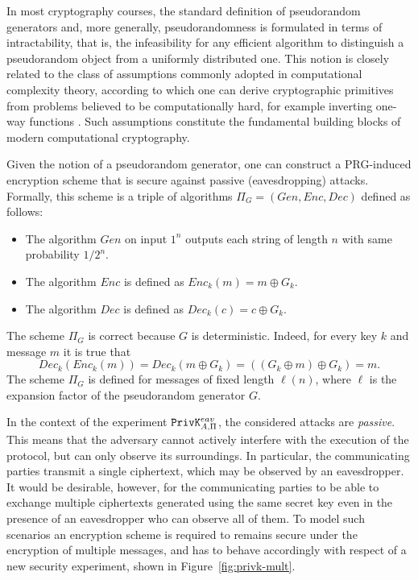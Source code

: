 In most cryptography courses, the standard definition of pseudorandom generators and, more generally, pseudorandomness is formulated in terms of intractability, that is, the infeasibility for any efficient algorithm to distinguish a pseudorandom object from a uniformly distributed one. This notion is closely related to the class of assumptions commonly adopted in computational complexity theory, according to which one can derive cryptographic primitives from problems believed to be computationally hard, for example inverting one-way functions \cite{compuational-complexity}. Such assumptions constitute the fundamental building blocks of modern computational cryptography.

Given the notion of a pseudorandom generator, one can construct a PRG-induced encryption scheme that is secure against passive (eavesdropping) attacks. Formally, this scheme is a triple of algorithms $\Pi_G = (Gen, Enc, Dec)$ defined as follows:
\begin{itemize}
    \item The algorithm $Gen$ on input $1^n$ outputs each string of length $n$ with same probability $1/2^n$.
    \item The algorithm $Enc$ is defined as $Enc_k(m) = m \oplus G_k$.
    \item The algorithm $Dec$ is defined as $Dec_k(c) = c \oplus G_k$.
\end{itemize}

The scheme $\Pi_G$ is correct because $G$ is deterministic. Indeed, for every key $k$ and message $m$ it is true that 
\[ Dec_k(Enc_k(m)) = Dec_k(m \oplus G_k) = ((G_k \oplus m) \oplus G_k)  = m. \]
The scheme $\Pi_G$ is defined for messages of fixed length $\ell(n)$, where $\ell$ is the expansion factor of the pseudorandom generator $G$.

In the context of the experiment $\mathtt{PrivK}^{eav}_{A,\Pi}$, the considered attacks are \emph{passive}. This means that the adversary cannot actively interfere with the execution of the protocol, but can only observe its surroundings. In particular, the communicating parties transmit a single ciphertext, which may be observed by an eavesdropper. It would be desirable, however, for the communicating parties to be able to exchange multiple ciphertexts generated using the same secret key even in the presence of an eavesdropper who can observe all of them. To model such scenarios an encryption scheme is required to remains secure under the encryption of multiple messages, and has to behave accordingly with respect of a new security experiment, shown in Figure~\ref{fig:privk-mult}.

